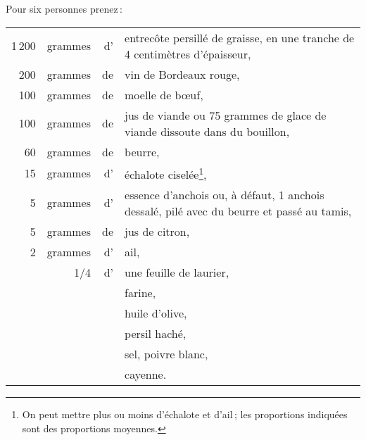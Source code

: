 {}

Pour six personnes prenez :

\medskip

\footnotesize
\begin{longtable}{rrrp{16em}}
  1 200 & grammes & d' & entrecôte persillé de graisse, en une tranche de 4 centimètres
                         d'épaisseur,                                                                     \\
    200 & grammes & de & vin de Bordeaux rouge,                                                           \\
    100 & grammes & de & moelle de bœuf,                                                                  \\
    100 & grammes & de & jus de viande ou 75 grammes de glace de viande dissoute dans du
                         bouillon,                                                                        \\
     60 & grammes & de & beurre,                                                                          \\
     15 & grammes & d’ & échalote ciselée\footnote{On peut mettre plus ou moins d'échalote
                                  et d'ail ; les proportions indiquées sont des proportions
                                  moyennes.},                                                             \\
      5 & grammes & d' & essence d'anchois ou, à défaut, 1 anchois dessalé, pilé avec du
                         beurre et passé au tamis,                                                        \\
      5 & grammes & de & jus de citron,                                                                   \\
      2 & grammes & d' & ail,                                                                             \\
        &     1/4 & d' & une feuille de laurier,                                                          \\
        &         &    & farine,                                                                          \\
        &         &    & huile d'olive,                                                                   \\
        &         &    & persil haché,                                                                    \\
        &         &    & sel, poivre blanc,                                                               \\
        &         &    & cayenne.                                                                         \\
\end{longtable}
\normalsize

